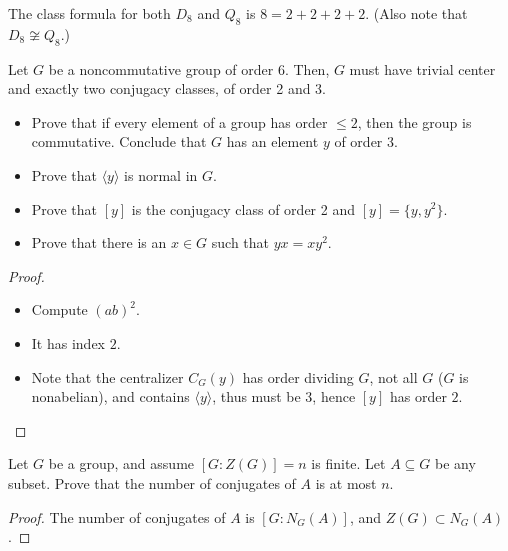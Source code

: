 \documentclass[openany]{book}
\newcommand{\la}{\langle}
\newcommand{\ra}{\rangle}
\begin{document}


\begin{prop}
The class formula for both $D_8$ and $Q_8$ is $8 = 2 + 2 + 2 + 2$. (Also note that $D_8 \not\cong Q_8$.)
\end{prop}

\begin{prob}[1.13]
Let $G$ be a noncommutative group of order 6. Then, $G$ must have trivial center and exactly two conjugacy classes, of order 2 and 3.
\begin{itemize}
    \item Prove that if every element of a group has order $\leq 2$, then the group is commutative. Conclude that $G$ has an element $y$ of order 3.
    \item Prove that $\langle y \rangle$ is normal in $G$.
    \item Prove that $[y]$ is the conjugacy class of order 2 and $[y]=\{y,y^2\}$.
    \item Prove that there is an $x \in G$ such that $yx = xy^2$.
\end{itemize}
\end{prob}
\begin{proof}
    \begin{itemize}
        \item Compute $(ab)^2$.
        \item It has index $2$.
        \item Note that the centralizer $C_G(y)$ has order dividing $G$, not all $G$ ($G$ is nonabelian), and contains $\la y\ra$, thus must be $3$, hence $[y]$ has order $2$.
    \end{itemize}
\end{proof}

\begin{prob}[1.14]
Let $G$ be a group, and assume $[G : Z(G)] = n$ is finite. Let $A \subseteq G$ be any subset. Prove that the number of conjugates of $A$ is at most $n$.
\end{prob}
\begin{proof}
    The number of conjugates of $A$ is $[G: N_G(A)]$, and $Z(G)\subset N_G(A)$. 
\end{proof}
\end{document}
